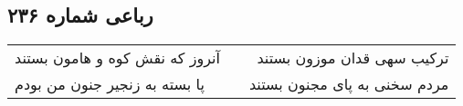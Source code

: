 \begin{center}
\section*{رباعی شماره ۲۳۶}
\label{sec:sh236}
\begin{longtable}{l p{0.5cm} r}
آنروز که نقش کوه و هامون بستند
&&
ترکیب سهی قدان موزون بستند
\\
پا بسته به زنجیر جنون من بودم
&&
مردم سخنی به پای مجنون بستند
\\
\end{longtable}
\end{center}
